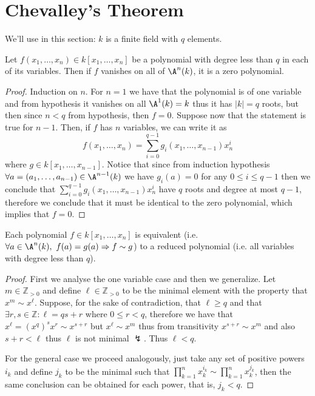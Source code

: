 \section{Chevalley's Theorem}

\begin{remark}
   We'll use in this section: \(k\) is a finite field with \(q\) elements.
\end{remark}


\begin{lemma}
   Let \(f(x_1,\dots,x_n) \in k[x_1, \dots, x_n]\) be a polynomial with degree
   less than  \(q\) in each of its variables. Then if \(f\) vanishes on all of
   \(\A^n(k)\), it is a zero polynomial.
\end{lemma}

\begin{proof}
   Induction on \(n\). For \(n = 1\) we have that the polynomial is of one
   variable and from hypothesis it vanishes on all \(\A^1(k) = k\) thus it has
   \(|k| = q \) roots, but then since \(n < q\) from hypothesis, then \(f = 0\).
   Suppose now that the statement is true for \(n-1\). Then, if \(f\) has \(n\)
   variables, we can write it as
   \[
      f(x_1, \dots, x_n) = \sum_{i=0}^{q-1} g_i(x_1, \dots, x_{n-1}) x_n^i
   \] 
   where \(g \in k[x_1, \dots, x_{n-1}]\). Notice that since from induction
   hypothesis \(\forall a = (a_1, \dots, a_{n-1}) \in \A^{n-1}(k)\) we have
   \(g_i(a) = 0\) for any \(0 \leqslant i \leqslant q-1\) then we conclude that
   \(\sum_{i=0}^{q-1}g_i(x_1,\dots,x_{n-1})x_n^i\) have \(q\) roots and  degree
   at most \(q-1\), therefore we conclude that it must be identical to the zero
   polynomial, which implies that \(f = 0\).
\end{proof}

\begin{lemma}
   Each polynomial \(f \in k[x_1, \dots, x_n]\) is equivalent (i.e. \(\forall a
   \in \A^n(k),\ f(a) = g(a) \Rightarrow f \sim g\)) to a reduced polynomial
   (i.e. all variables with degree less than \(q\)).
\end{lemma}

\begin{proof}
   First we analyse the one variable case and then we generalize. Let \(m  \in
   \mathbb{Z}_{> 0}\) and define \(\ell \in \mathbb{Z}_{>0}\) to be the minimal
   element with the property that \(x^m \sim x^\ell\). Suppose, for the sake of
   contradiction, that \(\ell \geqslant q\) and that \(\exists r,s \in
   \mathbb{Z} : \ell = qs + r\) where \(0 \leqslant r < q\), therefore we have
   that \( x^\ell = (x^q)^sx^r \sim x^{s+r}\) but \(x^\ell \sim x^m\) thus from
   transitivity \(x^{s+r} \sim x^m\) and also  \(s+r < \ell\) thus  \(\ell\) is
   not minimal \(\lightning\). Thus \(\ell < q\).

   For the general case we proceed analogously, just take any set of positive
   powers \(i_k\) and define \(j_k\) to be the minimal such that \(\prod_{k=1}^n
   x_k^{i_k} \sim \prod_{k=1}^n x_k^{j_k}\), then the same conclusion can be
   obtained for each power, that is, \(j_k < q\).
\end{proof}


